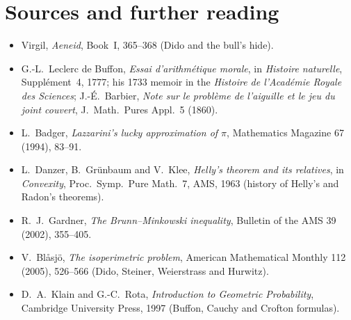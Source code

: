 \section*{Sources and further reading}

\begin{itemize}
\item Virgil, \emph{Aeneid}, Book~I, 365--368 (Dido and the bull's hide).
\item G.-L.~Leclerc de Buffon, \emph{Essai d'arithm\'etique morale}, in \emph{Histoire naturelle}, Suppl\'ement~4, 1777; his 1733 memoir in the \emph{Histoire
de l'Acad\'emie Royale des Sciences}; J.-\'E.~Barbier, \emph{Note sur le probl\`eme de l'aiguille et le jeu du joint couvert}, J.\ Math.\ Pures Appl.\ 5 (1860).
\item L.~Badger, \emph{Lazzarini's lucky approximation of $\pi$}, Mathematics Magazine 67 (1994), 83--91.
\item L.~Danzer, B.~Gr\"unbaum and V.~Klee, \emph{Helly's theorem and its relatives}, in \emph{Convexity}, Proc.\ Symp.\ Pure Math.\ 7, AMS, 1963 (history of
Helly's and Radon's theorems).
\item R.~J.~Gardner, \emph{The Brunn--Minkowski inequality}, Bulletin of the AMS 39 (2002), 355--405.
\item V.~Bl\aa sj\"o, \emph{The isoperimetric problem}, American Mathematical Monthly 112 (2005), 526--566 (Dido, Steiner, Weierstrass and Hurwitz).
\item D.~A.~Klain and G.-C.~Rota, \emph{Introduction to Geometric Probability}, Cambridge University Press, 1997 (Buffon, Cauchy and Crofton formulas).
\end{itemize}
